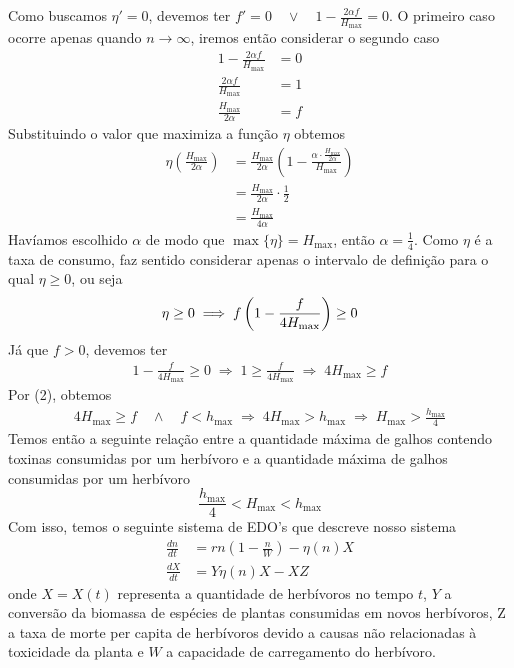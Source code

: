 \documentclass{article}
\begin{document}
Como buscamos $\eta' = 0$, devemos ter $f' = 0 \quad \lor \quad 1 - \frac{2 \alpha f}{H_{\max}} = 0$. O primeiro caso ocorre apenas quando $n \to \infty$, iremos então considerar o segundo caso
\begin{align*}
    1 - \frac{2 \alpha f}{H_{\max}} &= 0 \\
    \frac{2 \alpha f}{H_{\max}} &= 1 \\
    \frac{H_{\max}}{2\alpha} &= f
\end{align*}
Substituindo o valor que maximiza a função $\eta$ obtemos
\begin{align*}
    \eta\left(\frac{H_{\max}}{2\alpha}\right) &= \frac{H_{\max}}{2\alpha}\left(1 - \frac{\alpha \cdot \frac{H_{\max}}{2\alpha}}{H_{\max}} \right) \\
                                                &= \frac{H_{\max}}{2\alpha} \cdot \frac{1}{2} \\
                                                &= \frac{H_{\max}}{4\alpha} 
\end{align*}
Havíamos escolhido $\alpha$ de modo que $\max\{\eta\} = H_{\max}$, então $\alpha = \frac{1}{4}$. Como $\eta$ é a taxa de consumo, faz sentido considerar apenas o intervalo de definição para o qual $\eta \geq 0$, ou seja
\begin{equation*}
    \eta \geq 0\;\Longrightarrow\;f\left(1 - \frac{f}{4H_{\max}}\right) \geq 0 \\
\end{equation*}
Já que $f > 0$, devemos ter
\begin{align*}
    1 - \frac{f}{4H_{\max}} \geq 0\;\Longrightarrow\;1 \geq \frac{f}{4H_{\max}}\;\Longrightarrow\;4H_{\max} \geq f
\end{align*}
Por (2), obtemos
\begin{align*}
    4H_{\max} \geq f \quad \land \quad f < h_{\max}\;\Longrightarrow\;4H_{\max} > h_{\max}\;\Longrightarrow\;H_{\max} > \frac{h_{\max}}{4}
\end{align*}
Temos então a seguinte relação entre a quantidade máxima de galhos contendo toxinas consumidas por um herbívoro e a quantidade máxima de galhos consumidas por um herbívoro
\begin{equation}
    \frac{h_{\max}}{4} < H_{\max} < h_{\max}
\end{equation}
Com isso, temos o seguinte sistema de EDO's que descreve nosso sistema
\begin{align*}
    \frac{dn}{dt} &= rn\left( 1 - \frac{n}{W} \right) - \eta(n)X \\
    \frac{dX}{dt} &= Y\eta(n)X - XZ
\end{align*}
onde $X = X(t)$ representa a quantidade de herbívoros no tempo $t$, $Y$  a conversão da biomassa de espécies de plantas consumidas em novos herbívoros, Z a taxa de morte per capita de herbívoros devido a causas não relacionadas à toxicidade da planta e $W$ a capacidade de carregamento do herbívoro. \\
\end{document}
